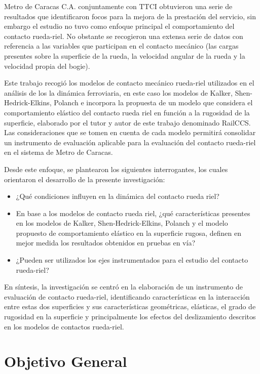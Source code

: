 \documentclass[main]{subfiles}
\begin{document}
	Metro de Caracas C.A. conjuntamente con TTCI obtuvieron una serie de resultados que identificaron focos para la mejora de la prestación del servicio, sin embargo el estudio no tuvo como enfoque principal el comportamiento del contacto rueda-riel. No obstante se recogieron una extensa serie de datos con referencia a las variables que participan en el contacto mecánico (las cargas presentes sobre la superficie de la rueda, la velocidad angular de la rueda y la velocidad propia del bogie).

	Este trabajo recogió los modelos de contacto mecánico rueda-riel utilizados en el análisis de los la dinámica ferroviaria, en este caso los modelos de Kalker, Shen-Hedrick-Elkins, Polanch e incorpora la propuesta de un modelo que considera el comportamiento elástico del contacto rueda riel en función a la rugosidad de la superficie, elaborado por el tutor y autor de este trabajo denominado RailCCS. Las consideraciones que se tomen en cuenta de cada modelo permitirá consolidar un instrumento de evaluación aplicable para la evaluación del contacto rueda-riel en el sistema de Metro de Caracas.

	Desde este enfoque, se plantearon los siguientes interrogantes, los cuales orientaron el desarrollo de la presente investigación: 

\begin{itemize}
	\item ¿Qué condiciones influyen en la dinámica del contacto rueda riel?

	\item En base a los modelos de contacto rueda riel, ¿qué características presentes en los modelos de Kalker, Shen-Hedrick-Elkins, Polanch y el modelo propuesto de comportamiento elástico en la superficie rugosa, definen en mejor medida los resultados obtenidos en pruebas en vía?

	\item ¿Pueden ser utilizados los ejes instrumentados para el estudio del contacto rueda-riel?
\end{itemize}

	En síntesis, la investigación se centró en la elaboración de un instrumento de evaluación de contacto rueda-riel, identificando características en la interacción entre estas dos superficies y sus características geométricas, elásticas, el grado de rugosidad en la superficie y principalmente los efectos del deslizamiento descritos en los modelos de contactos rueda-riel.

\section{Objetivo General}
\end{document}
